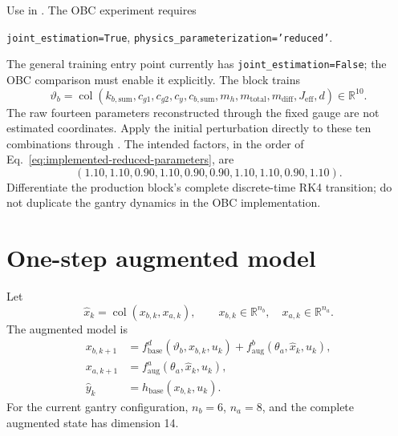 \documentclass[11pt,a4paper]{article}
\newcommand{\R}{\mathbb R}
\newcommand{\col}{\operatorname{col}}
\begin{document}
Use  in
. The OBC experiment requires
\begin{center}
    \texttt{joint\_estimation=True},\qquad
    \texttt{physics\_parameterization='reduced'}.
\end{center}
The general training entry point currently has
\texttt{joint\_estimation=False}; the OBC comparison must enable it explicitly.
The block trains
\begin{equation}
\vartheta_b=\col(
 k_{b,\mathrm{sum}},c_{g1},c_{g2},c_y,c_{b,\mathrm{sum}},m_h,
 m_{\mathrm{total}},m_{\mathrm{diff}},J_{\mathrm{eff}},d)
 \in\R^{10}.
\label{eq:implemented-reduced-parameters}
\end{equation}
The raw fourteen parameters reconstructed through the fixed gauge are not
estimated coordinates. Apply the initial perturbation directly to these ten
combinations through . The intended factors, in the
order of Eq.~\eqref{eq:implemented-reduced-parameters}, are
\begin{equation}
    (1.10,1.10,0.90,1.10,0.90,0.90,1.10,1.10,0.90,1.10).
\end{equation}
Differentiate the production block's complete discrete-time RK4 transition;
do not duplicate the gantry dynamics in the OBC implementation.

\section{One-step augmented model}

Let
\begin{equation}
    \hat x_k=\col(x_{b,k},x_{a,k}),
    \qquad x_{b,k}\in\R^{n_b},\quad x_{a,k}\in\R^{n_a}.
\end{equation}
The augmented model is
\begin{equation}
\boxed{
\begin{aligned}
    x_{b,k+1}
    &=f_{\mathrm{base}}^d(\vartheta_b,x_{b,k},u_k)
      +f_{\mathrm{aug}}^b(\theta_a,\hat x_k,u_k),\\
    x_{a,k+1}
    &=f_{\mathrm{aug}}^a(\theta_a,\hat x_k,u_k),\\
    \hat y_k&=h_{\mathrm{base}}(x_{b,k},u_k).
\end{aligned}}
\label{eq:model}
\end{equation}
For the current gantry configuration, \(n_b=6\), \(n_a=8\), and the complete
augmented state has dimension 14.
\end{document}
